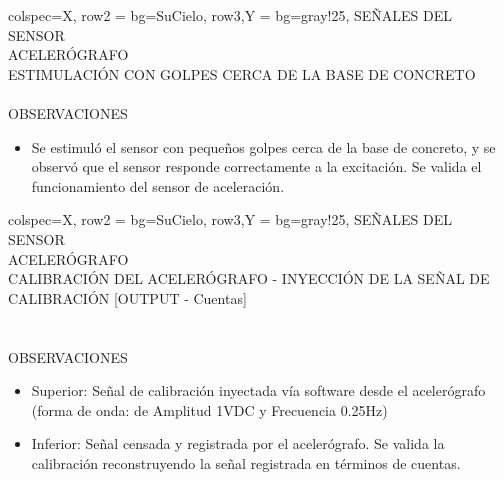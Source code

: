 % 
\newpage
\begin{tblr}{
        colspec={X},
        row{2} = {bg=SuCielo},
        row{3,Y} = {bg=gray!25},
    } %
    SEÑALES DEL SENSOR \\
    ACELERÓGRAFO \MakeUppercase{} \\
    ESTIMULACIÓN CON GOLPES CERCA DE LA BASE DE CONCRETO \\
     \\
    OBSERVACIONES \\
    \begin{itemize}
        \item Se estimuló el sensor con pequeños golpes cerca de la base de concreto, y se observó que el sensor responde correctamente a la excitación. Se valida el funcionamiento del sensor de aceleración.
    \end{itemize}
\end{tblr}
% 
\newpage
\begin{tblr}{
        colspec={X},
        row{2} = {bg=SuCielo},
        row{3,Y} = {bg=gray!25},
    } %
    SEÑALES DEL SENSOR \\
    ACELERÓGRAFO \MakeUppercase{} \\
    CALIBRACIÓN DEL ACELERÓGRAFO - INYECCIÓN DE LA SEÑAL DE CALIBRACIÓN [OUTPUT - Cuentas] \\
     \\
             \\
    OBSERVACIONES \\
    \begin{itemize}
        \item Superior: Señal de calibración inyectada vía software desde el acelerógrafo (forma de onda:  de Amplitud 1VDC y Frecuencia 0.25Hz)
        \item Inferior: Señal censada y registrada por el acelerógrafo. Se valida la calibración reconstruyendo la señal registrada en términos de cuentas.
    \end{itemize}
\end{tblr}
% 
\newpage
